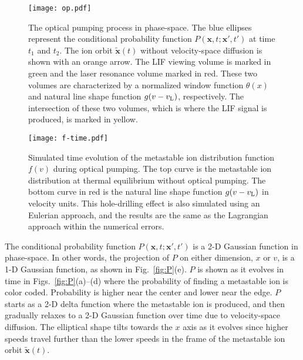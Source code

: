 \documentclass[aip,pop,reprint]{revtex4-1}
\begin{document}
\begin{figure}
\begin{center}
\texttt{[image: op.pdf]}
\caption{The optical pumping process in phase-space. The blue ellipses represent the conditional probability function $P(\mathbf{x},t;\mathbf{x'},t')$ at time $t_1$ and $t_2$. The ion orbit $\mathbf{\tilde{x}}(t)$ without velocity-space diffusion is shown with an orange arrow. The LIF viewing volume is marked in green and the laser resonance volume marked in red. These two volumes are characterized by a normalized window function $\theta(x)$ and natural line shape function $g(v-v_\textup{L})$, respectively. The intersection of these two volumes, which is where the LIF signal is produced, is marked in yellow. }
\label{fig:op}
\end{center}
\end{figure}

\begin{figure}
\begin{center}
\texttt{[image: f-time.pdf]}
\caption{Simulated time evolution of the metastable ion distribution function $f(v)$ during optical pumping. The top curve is the metastable ion distribution at thermal equilibrium without optical pumping. The bottom curve in red is the natural line shape function $g(v-v_\textup{L})$ in velocity units. This hole-drilling effect is also simulated using an Eulerian approach, and the results are the same as the Lagrangian approach within the numerical errors.}
\label{fig:op-laser}
\end{center}
\end{figure}

The conditional probability function $P(\mathbf{x},t;\mathbf{x'},t')$ is a 2-D Gaussian function in phase-space. In other words, the projection of $P$ on either dimension, $x$ or $v$, is a 1-D Gaussian function, as shown in Fig.~\ref{fig:P}(e). $P$ is shown as it evolves in time in Figs.~\ref{fig:P}(a)--(d) where the probability of finding a metastable ion is color coded. Probability is higher near the center and lower near the edge. $P$ starts as a 2-D delta function where the metastable ion is produced, and then gradually relaxes to a 2-D Gaussian function over time due to velocity-space diffusion. The elliptical shape tilts towards the $x$ axis as it evolves since higher speeds travel further than the lower speeds in the frame of the metastable ion orbit $\mathbf{\tilde{x}}(t)$.
\end{document}
